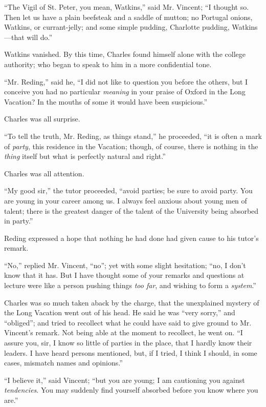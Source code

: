 ``The Vigil of St. Peter, you mean, Watkins,'' said Mr.
Vincent; ``I thought so. Then let us have a plain beefsteak and a
saddle of mutton; no Portugal onions, Watkins, or currant-jelly; and
some simple pudding, Charlotte pudding, Watkins—that will do.''

Watkins vanished. By this time, Charles found himself alone with
the college authority; who began to speak to him in a more
confidential tone.

``Mr. Reding,'' said he, ``I did not like to question
you before the others, but I conceive you had no particular \emph{meaning}
in your praise of Oxford in the Long Vacation? In the mouths of some
it would have been suspicious.''

Charles was all surprise.

``To tell the truth, Mr. Reding, as things stand,'' he
proceeded, ``it is often a mark of \emph{party}, this residence in
the Vacation; though, of course, there is nothing in the \emph{thing}
itself but what is perfectly natural and right.''

Charles was all attention.

``My good sir,'' the tutor proceeded, ``avoid parties;
be sure to avoid party. You are young in your career among us. I
always feel anxious about young men of talent; there is the
greatest danger of the talent of the University being absorbed in
party.''

Reding expressed a hope that nothing he had done had given cause to
his tutor's remark.

``No,'' replied Mr. Vincent, ``no''; yet with some
slight hesitation; ``no, I don't know that it has. But I have
thought some of your remarks and questions at lecture were like a
person pushing things \emph{too far}, and wishing to form a \emph{system}.''

Charles was so much taken aback by the charge, that the unexplained
mystery of the Long Vacation went out of his head. He said he was
``very sorry,'' and ``obliged''; and tried to
recollect what he could have said to give ground to Mr. Vincent's
remark. Not being able at the moment to recollect, he went on. ``I
assure you, sir, I know so little of parties in the place, that I
hardly know their leaders. I have heard persons mentioned, but, if I
tried, I think I should, in some cases, mismatch names and
opinions.''

``I believe it,'' said Vincent; ``but you are young; I
am cautioning you against \emph{tendencies}. You may suddenly find
yourself absorbed before you know where you are.''

